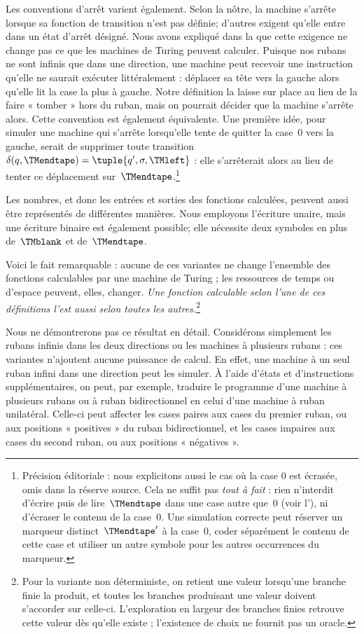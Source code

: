 \documentclass[../../../include/open-logic-section]{subfiles}
\begin{document}
Les conventions d'arrêt varient également. Selon la nôtre,
la machine s'arrête lorsque sa fonction de transition n'est
pas définie; d'autres exigent qu'elle entre dans un état
d'arrêt désigné. Nous avons expliqué dans la
 que cette exigence ne change pas ce que
les machines de Turing peuvent calculer. Puisque nos
rubans ne sont infinis que dans une direction, une machine
peut recevoir une instruction qu'elle ne saurait exécuter
littéralement : déplacer sa tête vers la gauche alors qu'elle
lit la case la plus à gauche. Notre définition la laisse
sur place au lieu de la faire « tomber » hors du ruban,
mais on pourrait décider que la machine s'arrête alors.
Cette convention est également équivalente. Une première
idée, pour simuler une machine qui s'arrête lorsqu'elle
tente de quitter la case~$0$ vers la gauche, serait de
supprimer toute transition
$\delta(q,\TMendtape)=
\tuple{q',\sigma,\TMleft}$ : elle s'arrêterait alors
au lieu de tenter ce déplacement sur~$\TMendtape$.\footnote{
Précision éditoriale : nous explicitons aussi le cas où la case $0$ est écrasée, omis dans la réserve source. Cela ne suffit pas \emph{tout à fait} : rien n'interdit d'écrire
puis de lire~$\TMendtape$ dans une case autre que~$0$
(voir l'), ni d'écraser le contenu
de la case~$0$. Une simulation correcte peut réserver
un marqueur distinct~$\TMendtape'$ à la case~$0$,
coder séparément le contenu de cette case et utiliser
un autre symbole pour les autres occurrences du marqueur.}

Les nombres, et donc les entrées et sorties des fonctions
calculées, peuvent aussi être représentés de différentes
manières. Nous employons l'écriture unaire, mais une
écriture binaire est également possible; elle nécessite
deux symboles en plus de~$\TMblank$ et de~$\TMendtape$.

Voici le fait remarquable : aucune de ces variantes
ne change l'ensemble des fonctions calculables par une
machine de Turing ; les ressources de temps ou d'espace peuvent, elles, changer. \emph{Une fonction calculable selon
l'une de ces définitions l'est aussi selon toutes les autres.}\footnote{Pour la variante non déterministe, on retient une valeur lorsqu'une branche finie la produit, et toutes les branches produisant une valeur doivent s'accorder sur celle-ci. L'exploration en largeur des branches finies retrouve cette valeur dès qu'elle existe ; l'existence de choix ne fournit pas un oracle.}

Nous ne démontrerons pas ce résultat en détail. Considérons
simplement les rubans infinis dans les deux directions ou
les machines à plusieurs rubans : ces variantes n'ajoutent
aucune puissance de calcul. En effet, une machine à un seul
ruban infini dans une direction peut les simuler. À l'aide
d'états et d'instructions supplémentaires, on peut, par
exemple, traduire le programme d'une machine à plusieurs
rubans ou à ruban bidirectionnel en celui d'une machine
à ruban unilatéral. Celle-ci peut affecter les cases paires
aux cases du premier ruban, ou aux positions « positives »
du ruban bidirectionnel, et les cases impaires aux cases
du second ruban, ou aux positions « négatives ».
\end{document}

